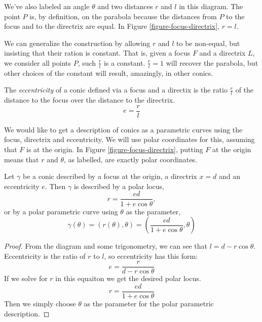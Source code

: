 \documentclass[fleqn,letterpaper]{report}
\begin{document}
We've also labeled an angle $\theta$ and two distances $r$ and
$l$ in this diagram. The point $P$ is, by definition, on the
parabola because the distances from $P$ to the focus and to
the directrix are equal.  In Figure \ref{figure-focus-directrix},
$r=l$.

We can generalize the construction  by allowing $r$ and $l$ to
be non-equal, but insisting that their ration is constant.
That is, given a focus $F$ and a directrix $L$, we consider
all points $P$, such $\frac{r}{l}$ is a constant. $\frac{r}{l}
= 1$ will recover the parabola, but other choices of the
constant will result, amazingly, in other conics. 

\begin{defn}
The \emph{eccentricity} of a conic defined via a focus and
a directix is the ratio $\frac{r}{l}$ of the distance to the
focus over the distance to the directrix.
\begin{equation*}
e = \frac{r}{l}
\end{equation*}
\end{defn}

We would like to get a description of conics as a
parametric curves using the focus, directrix and eccentricity. We
will use polar coordinates for this, assuming that $F$ is at
the origin. In Figure \ref{figure-focus-directrix}, putting $F$
at the origin means that $r$ and $\theta$, as labelled, are
exactly polar coordinates. 

\begin{prop}
Let $\gamma$ be a conic described by a focus at the origin, a
directrix $x=d$ and an eccentricity $e$. Then $\gamma$ is
described by a polar locus,
\begin{equation*}
r = \frac{ed}{1 + e \cos \theta},
\end{equation*}
or by a polar parametric curve using $\theta$ as the
parameter,
\begin{equation*}
\gamma(\theta) = (r(\theta), \theta) = \left(\frac{ed}{1 + e
\cos \theta}, \theta\right)
\end{equation*}
\end{prop}

\begin{proof}
From the diagram and some trigonometry, we can see that $l = d
- r\cos \theta$. Eccentricity is the ratio of $r$ to $l$, so
eccentricity has this form:
\begin{equation*}
e = \frac{r}{d-r\cos\theta}
\end{equation*}
If we solve for $r$ in this equaiton we get the desired polar
locus.
\begin{equation}
\label{equation-conic-eccentricity-form}
r = \frac{ed}{1 + e \cos \theta}
\end{equation}
Then we simply choose $\theta$ as the parameter for the
polar parametric description.
\end{proof}
\end{document}

